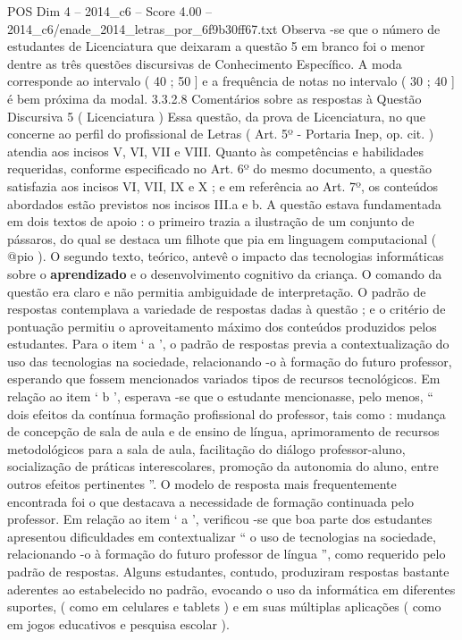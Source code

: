 \begin{textsample}{POS Dim 4 – 2014\_c6 – Score 4.00 – 2014\_c6/enade\_2014\_letras\_por\_6f9b30ff67.txt}
Observa -se que o número de estudantes de Licenciatura que deixaram a questão 5 em branco foi o menor dentre as três questões discursivas de Conhecimento Específico.
A moda corresponde ao intervalo ( 40 ; 50 ] e a frequência de notas no intervalo ( 30 ; 40 ] é bem próxima da modal. 3.3.2.8 Comentários sobre as respostas à Questão Discursiva 5 ( Licenciatura ) Essa questão, da prova de Licenciatura, no que concerne ao perfil do profissional de Letras ( Art. 5º - Portaria Inep, op. cit. ) atendia aos incisos V, VI, VII e VIII.
Quanto às competências e habilidades requeridas, conforme especificado no Art. 6º do mesmo documento, a questão satisfazia aos incisos VI, VII, IX e X ; e em referência ao Art. 7º, os conteúdos abordados estão previstos nos incisos III.a e b.
A questão estava fundamentada em dois textos de apoio : o primeiro trazia a ilustração de um conjunto de pássaros, do qual se destaca um filhote que pia em linguagem computacional ( @pio ).
O segundo texto, teórico, antevê o impacto das tecnologias informáticas sobre o \textbf{aprendizado} e o desenvolvimento cognitivo da criança.
O comando da questão era claro e não permitia ambiguidade de interpretação.
O padrão de respostas contemplava a variedade de respostas dadas à questão ; e o critério de pontuação permitiu o aproveitamento máximo dos conteúdos produzidos pelos estudantes.
Para o item ‘ a ’, o padrão de respostas previa a contextualização do uso das tecnologias na sociedade, relacionando -o à formação do futuro professor, esperando que fossem mencionados variados tipos de recursos tecnológicos.
Em relação ao item ‘ b ’, esperava -se que o estudante mencionasse, pelo menos, “ dois efeitos da contínua formação profissional do professor, tais como : mudança de concepção de sala de aula e de ensino de língua, aprimoramento de recursos metodológicos para a sala de aula, facilitação do diálogo professor-aluno, socialização de práticas interescolares, promoção da autonomia do aluno, entre outros efeitos pertinentes ”.
O modelo de resposta mais frequentemente encontrada foi o que destacava a necessidade de formação continuada pelo professor.
Em relação ao item ‘ a ’, verificou -se que boa parte dos estudantes apresentou dificuldades em contextualizar “ o uso de tecnologias na sociedade, relacionando -o à formação do futuro professor de língua ”, como requerido pelo padrão de respostas.
Alguns estudantes, contudo, produziram respostas bastante aderentes ao estabelecido no padrão, evocando o uso da informática em diferentes suportes, ( como em celulares e tablets ) e em suas múltiplas aplicações ( como em jogos educativos e pesquisa escolar ).

\end{textsample}
